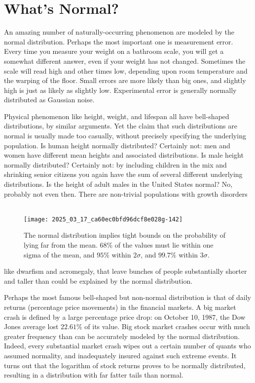 \documentclass[10pt]{article}
\begin{document}
\section*{What's Normal?}
An amazing number of naturally-occurring phenomenon are modeled by the normal distribution. Perhaps the most important one is measurement error. Every time you measure your weight on a bathroom scale, you will get a somewhat different answer, even if your weight has not changed. Sometimes the scale will read high and other times low, depending upon room temperature and the warping of the floor. Small errors are more likely than big ones, and slightly high is just as likely as slightly low. Experimental error is generally normally distributed as Gaussian noise.

Physical phenomenon like height, weight, and lifespan all have bell-shaped distributions, by similar arguments. Yet the claim that such distributions are normal is usually made too casually, without precisely specifying the underlying population. Is human height normally distributed? Certainly not: men and women have different mean heights and associated distributions. Is male height normally distributed? Certainly not: by including children in the mix and shrinking senior citizens you again have the sum of several different underlying distributions. Is the height of adult males in the United States normal? No, probably not even then. There are non-trivial populations with growth disorders\
\
\begin{figure}[h]
\centering
\texttt{[image: 2025\_03\_17\_ca60ec0bfd96dcf8e028g-142]}
\caption{The normal distribution implies tight bounds on the probability of lying far from the mean. $68 \%$ of the values must lie within one sigma of the mean, and $95 \%$ within $2 \sigma$, and $99.7 \%$ within $3 \sigma$.} 
\end{figure}

like dwarfism and acromegaly, that leave bunches of people substantially shorter and taller than could be explained by the normal distribution.

Perhaps the most famous bell-shaped but non-normal distribution is that of daily returns (percentage price movements) in the financial markets. A big market crash is defined by a large percentage price drop: on October 10, 1987, the Dow Jones average lost $22.61 \%$ of its value. Big stock market crashes occur with much greater frequency than can be accurately modeled by the normal distribution. Indeed, every substantial market crash wipes out a certain number of quants who assumed normality, and inadequately insured against such extreme events. It turns out that the logarithm of stock returns proves to be normally distributed, resulting in a distribution with far fatter tails than normal.
\end{document}
